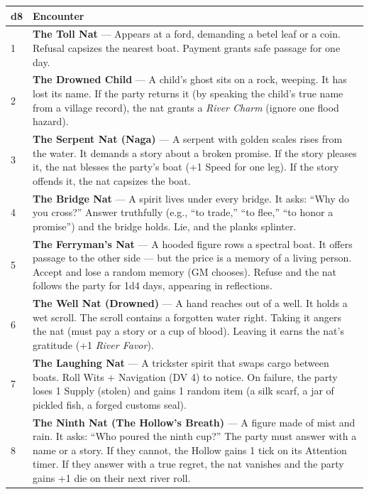 \begin{longtable}{|p{1.5cm}|p{10cm}|}
\hline
\rowcolor{gray!20}
\textbf{d8} & \textbf{Encounter} \\
\hline
1 & \textbf{The Toll Nat} --- Appears at a ford, demanding a betel leaf or a coin. Refusal capsizes the nearest boat. Payment grants safe passage for one day. \\
\hline
2 & \textbf{The Drowned Child} --- A child's ghost sits on a rock, weeping. It has lost its name. If the party returns it (by speaking the child's true name from a village record), the nat grants a \textit{River Charm} (ignore one flood hazard). \\
\hline
3 & \textbf{The Serpent Nat (Naga)} --- A serpent with golden scales rises from the water. It demands a story about a broken promise. If the story pleases it, the nat blesses the party's boat (+1 Speed for one leg). If the story offends it, the nat capsizes the boat. \\
\hline
4 & \textbf{The Bridge Nat} --- A spirit lives under every bridge. It asks: ``Why do you cross?'' Answer truthfully (e.g., ``to trade,'' ``to flee,'' ``to honor a promise'') and the bridge holds. Lie, and the planks splinter. \\
\hline
5 & \textbf{The Ferryman's Nat} --- A hooded figure rows a spectral boat. It offers passage to the other side --- but the price is a memory of a living person. Accept and lose a random memory (GM chooses). Refuse and the nat follows the party for 1d4 days, appearing in reflections. \\
\hline
6 & \textbf{The Well Nat (Drowned)} --- A hand reaches out of a well. It holds a wet scroll. The scroll contains a forgotten water right. Taking it angers the nat (must pay a story or a cup of blood). Leaving it earns the nat's gratitude (+1 \textit{River Favor}). \\
\hline
7 & \textbf{The Laughing Nat} --- A trickster spirit that swaps cargo between boats. Roll Wits + Navigation (DV 4) to notice. On failure, the party loses 1 Supply (stolen) and gains 1 random item (a silk scarf, a jar of pickled fish, a forged customs seal). \\
\hline
8 & \textbf{The Ninth Nat (The Hollow's Breath)} --- A figure made of mist and rain. It asks: ``Who poured the ninth cup?'' The party must answer with a name or a story. If they cannot, the Hollow gains 1 tick on its Attention timer. If they answer with a true regret, the nat vanishes and the party gains +1 die on their next river roll. \\
\hline
\end{longtable}

